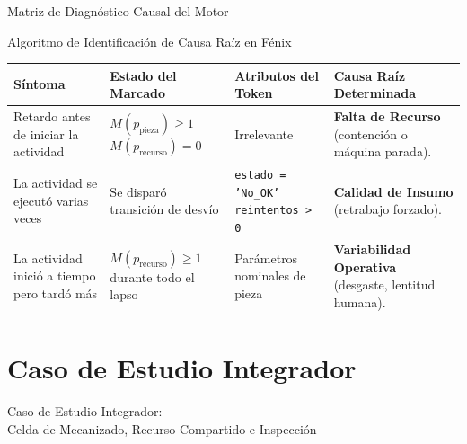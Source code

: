 \documentclass[10pt, aspectratio=169]{beamer}
\begin{document}
\begin{frame}{Matriz de Diagnóstico Causal del Motor}
	\begin{block}{Algoritmo de Identificación de Causa Raíz en Fénix}
		\small
		\begin{tabular}{|p{2.8cm}|p{3.0cm}|p{2.9cm}|p{3.3cm}|}
			\hline
			\textbf{Síntoma} & \textbf{Estado del Marcado} & \textbf{Atributos del Token} & \textbf{Causa Raíz Determinada} \\ \hline\hline
			Retardo antes de iniciar la actividad & $M(p_{\text{pieza}}) \ge 1$ \newline $M(p_{\text{recurso}}) = 0$ & Irrelevante & \textbf{Falta de Recurso} (contención o máquina parada). \\ \hline
			La actividad se ejecutó varias veces & Se disparó transición de desvío & \texttt{estado = 'No\_OK'} \newline \texttt{reintentos > 0} & \textbf{Calidad de Insumo} (retrabajo forzado). \\ \hline
			La actividad inició a tiempo pero tardó más & $M(p_{\text{recurso}}) \ge 1$ durante todo el lapso & Parámetros nominales de pieza & \textbf{Variabilidad Operativa} (desgaste, lentitud humana). \\ \hline
		\end{tabular}
	\end{block}
\end{frame}

\section{Caso de Estudio Integrador}

\begin{frame}{}
	\centering
	\Huge{Caso de Estudio Integrador: \\ Celda de Mecanizado, Recurso Compartido e Inspección}
\end{frame}
\end{document}
